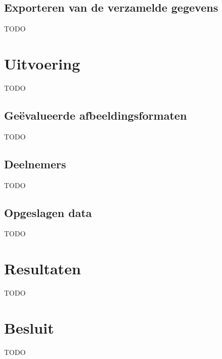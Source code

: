\subsection{Exporteren van de verzamelde gegevens}
\label{sec:onderzoek-evaluatietool-export}

TODO


\section{Uitvoering}
\label{sec:onderzoek-uitvoering}

TODO

\subsection{Geëvalueerde afbeeldingsformaten}
\label{sec:onderzoek-uitvoering-afbeeldingsformaten}

TODO

\subsection{Deelnemers}
\label{sec:onderzoek-uitvoering-deelnemers}

TODO

\subsection{Opgeslagen data}
\label{sec:onderzoek-uitvoering-opgeslagen-data}

TODO

\section{Resultaten}
\label{sec:onderzoek-resultaten}

TODO

\section{Besluit}
\label{sec:onderzoek-besluit}

TODO
